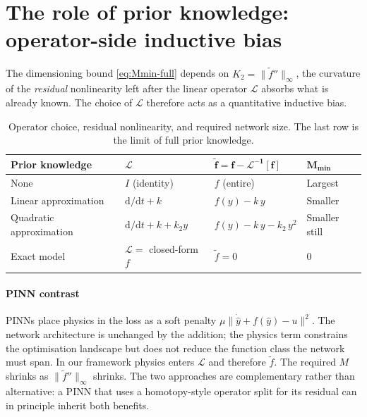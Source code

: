 \documentclass[preprint,12pt,numbers]{elsarticle}
\begin{document}
\section{The role of prior knowledge: operator-side inductive bias}
\label{sec:prior}

The dimensioning bound \eqref{eq:Mmin-full} depends on $K_2 = \|\tilde{f}''\|_\infty$,
the curvature of the \emph{residual} nonlinearity left after the linear
operator $\mathcal{L}$ absorbs what is already known. The choice of
$\mathcal{L}$ therefore acts as a quantitative inductive bias.

\begin{table}[h]
\centering
\caption{Operator choice, residual nonlinearity, and required network
size. The last row is the limit of full prior knowledge.}
\label{tab:prior}
\begin{tabular}{L{2.8cm} L{2.5cm} L{3.0cm} C{1.5cm}}
\toprule
\textbf{Prior knowledge} & $\boldsymbol{\mathcal{L}}$ & $\boldsymbol{\tilde{f} = f - \mathcal{L}^{-1}[f]}$ & $\boldsymbol{M_{\min}}$ \\
\midrule
None & $I$ (identity) & $f$ (entire) & Largest \\
Linear approximation & $\mathrm{d}/\mathrm{d}t + k$ & $f(y) - k\,y$ & Smaller \\
Quadratic approximation & $\mathrm{d}/\mathrm{d}t + k + k_2 y$ & $f(y) - k\,y - k_2\,y^2$ & Smaller still \\
Exact model & $\mathcal{L} = $ closed-form $f$ & $\tilde{f} = 0$ & $0$ \\
\bottomrule
\end{tabular}
\end{table}

\paragraph{PINN contrast} PINNs \cite{Raissi2019} place physics in the
loss as a soft penalty $\mu\|\dot{\hat{y}} + f(\hat{y}) - u\|^2$. The
network architecture is unchanged by the addition; the physics term
constrains the optimisation landscape but does not reduce the function
class the network must span. In our framework physics enters $\mathcal{L}$
and therefore $\tilde{f}$. The required $M$ shrinks as
$\|\tilde{f}''\|_\infty$ shrinks. The two approaches are complementary
rather than alternative: a PINN that uses a homotopy-style operator
split for its residual can in principle inherit both benefits.
\end{document}
